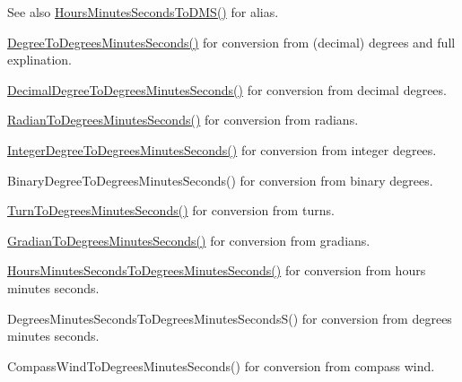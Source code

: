 \begin{DoxySeeAlso}{See also}
\mbox{\hyperlink{group___e_g_x_math-_angle_conversions-_hours_minutes_seconds_ga8fe72f56eebb44d7e8d7033476bbdd9b}{Hours\+Minutes\+Seconds\+To\+D\+M\+S()}} for alias. 

\mbox{\hyperlink{group___e_g_x_math-_angle_conversions-_degree_ga859585939255d52d010c780c68eb6e23}{Degree\+To\+Degrees\+Minutes\+Seconds()}} for conversion from (decimal) degrees and full explination. 

\mbox{\hyperlink{group___e_g_x_math-_angle_conversions-_decimal_degree_gac5a5255c8d120f71b60d8f60de1a1b6e}{Decimal\+Degree\+To\+Degrees\+Minutes\+Seconds()}} for conversion from decimal degrees. 

\mbox{\hyperlink{group___e_g_x_math-_angle_conversions-_radian_gadae98c255924fdc8b232b6539eae81a9}{Radian\+To\+Degrees\+Minutes\+Seconds()}} for conversion from radians. 

\mbox{\hyperlink{group___e_g_x_math-_angle_conversions-_integer_degree_ga204317877546ea6bbafe5ff558f55a16}{Integer\+Degree\+To\+Degrees\+Minutes\+Seconds()}} for conversion from integer degrees. 

Binary\+Degree\+To\+Degrees\+Minutes\+Seconds() for conversion from binary degrees. 

\mbox{\hyperlink{group___e_g_x_math-_angle_conversions-_turn_gaefdee18d878c2e66e7bd737c8900ab30}{Turn\+To\+Degrees\+Minutes\+Seconds()}} for conversion from turns. 

\mbox{\hyperlink{group___e_g_x_math-_angle_conversions-_gradian_ga5c81967ddb8f677634d161713174e419}{Gradian\+To\+Degrees\+Minutes\+Seconds()}} for conversion from gradians. 

\mbox{\hyperlink{group___e_g_x_math-_angle_conversions-_hours_minutes_seconds_gae9eb0acc65dfe6119936f29ac292afaa}{Hours\+Minutes\+Seconds\+To\+Degrees\+Minutes\+Seconds()}} for conversion from hours minutes seconds. 

Degrees\+Minutes\+Seconds\+To\+Degrees\+Minutes\+Seconds\+S() for conversion from degrees minutes seconds. 

Compass\+Wind\+To\+Degrees\+Minutes\+Seconds() for conversion from compass wind. 
\end{DoxySeeAlso}
\mbox{\label{group___e_g_x_math-_angle_conversions-_hours_minutes_seconds_ga8fe72f56eebb44d7e8d7033476bbdd9b}} 
